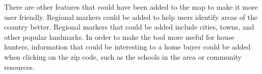 \documentclass{article}
\begin{document}
There are other features that could have been added to the map to make it more user friendly. Regional markers could be added to help users identify areas of the country better. Regional markers that could be added include cities, towns, and other popular landmarks. In order to make the tool more useful for house hunters, information that could be interesting to a home buyer could be added when clicking on the zip code, such as the schools in the area or community resources.
\end{document}
